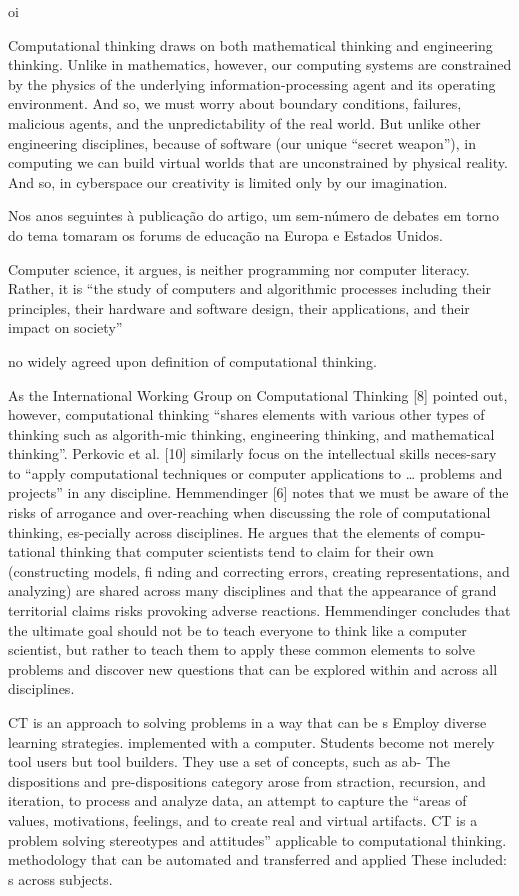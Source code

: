 \documentclass{book}
\begin{document}
oi

Computational thinking draws on both mathematical thinking and engineering thinking. Unlike in mathematics, however, our computing systems are constrained by the physics of the underlying information-processing agent and its operating environment. And so, we must worry about boundary conditions, failures, malicious agents, and the unpredictability of the real world. But unlike other engineering disciplines, because of software (our unique “secret weapon”), in computing we can build virtual worlds that are unconstrained by physical reality. And so, in cyberspace our creativity is limited only by our imagination.



Nos anos seguintes à publicação do artigo, um sem-número de debates em torno 
do tema tomaram os forums de educação na Europa e Estados Unidos. 



Computer science, it argues, is neither programming nor computer literacy. Rather, it is “the study of computers and algorithmic processes including their principles, their hardware and software design, their applications, and their impact on society”

no widely agreed upon definition of computational thinking.

As the International Working Group on Computational Thinking [8] pointed out, however, computational thinking “shares elements with various other types of thinking such as algorith-mic thinking, engineering thinking, and mathematical thinking”. Perkovic et al. [10] similarly focus on the intellectual skills neces-sary to “apply computational techniques or computer applications to … problems and projects” in any discipline. Hemmendinger [6] notes that we must be aware of the risks of arrogance and over-reaching when discussing the role of computational thinking, es-pecially across disciplines. He argues that the elements of compu-tational thinking that computer scientists tend to claim for their own (constructing models, fi nding and correcting errors, creating representations, and analyzing) are shared across many disciplines and that the appearance of grand territorial claims risks provoking adverse reactions. Hemmendinger concludes that the ultimate goal should not be to teach everyone to think like a computer scientist, but rather to teach them to apply these common elements to solve problems and discover new questions that can be explored within and across all disciplines.

CT is an approach to solving problems in a way that can be s Employ diverse learning strategies. implemented with a computer. Students become not merely tool users but tool builders. They use a set of concepts, such as ab- The dispositions and pre-dispositions category arose from straction, recursion, and iteration, to process and analyze data, an attempt to capture the “areas of values, motivations, feelings, and to create real and virtual artifacts. CT is a problem solving stereotypes and attitudes” applicable to computational thinking. methodology that can be automated and transferred and applied These included: s across subjects.
\end{document}

